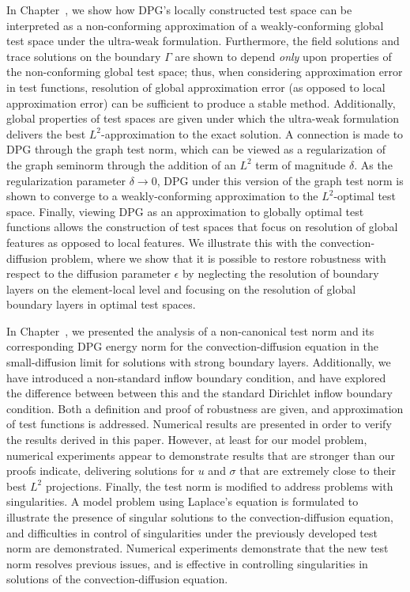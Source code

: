 In Chapter~, we show how DPG's locally constructed test space can be interpreted as a non-conforming approximation of a weakly-conforming global test space under the ultra-weak formulation.  Furthermore, the field solutions and trace solutions on the boundary $\Gamma$ are shown to depend \textit{only} upon properties of the non-conforming global test space; thus, when considering approximation error in test functions, resolution of global approximation error (as opposed to local approximation error) can be sufficient to produce a stable method.  Additionally, global properties of test spaces are given under which the ultra-weak formulation delivers the best $L^2$-approximation to the exact solution.  A connection is made to DPG through the graph test norm, which can be viewed as a regularization of the graph seminorm through the addition of an $L^2$ term of magnitude $\delta$. As the regularization parameter $\delta \rightarrow 0$, DPG under this version of the graph test norm is shown to converge to a weakly-conforming approximation to the $L^2$-optimal test space.  Finally, viewing DPG as an approximation to globally optimal test functions allows the construction of test spaces that focus on resolution of global features as opposed to local features.  We illustrate this with the convection-diffusion problem, where we show that it is possible to restore robustness with respect to the diffusion parameter $\epsilon$ by neglecting the resolution of boundary layers on the element-local level and focusing on the resolution of global boundary layers in optimal test spaces.  

In Chapter~, we presented the analysis of a non-canonical test norm and its corresponding DPG energy norm for the convection-diffusion equation in the small-diffusion limit for solutions with strong boundary layers. Additionally, we have introduced a non-standard inflow boundary condition, and have explored the difference between between this and the standard Dirichlet inflow boundary condition. Both a definition and proof of robustness are given, and approximation of test functions is addressed.  Numerical results are presented in order to verify the results derived in this paper. However, at least for our model problem, numerical experiments appear to demonstrate results that are stronger than our proofs indicate, delivering solutions for $u$ and $\sigma$ that are extremely close to their best $L^2$ projections.   Finally, the test norm is modified to address problems with singularities.  A model problem using Laplace's equation is formulated to illustrate the presence of singular solutions to the convection-diffusion equation, and difficulties in control of singularities under the previously developed test norm are demonstrated.  Numerical experiments demonstrate that the new test norm resolves previous issues, and is effective in controlling singularities in solutions of the convection-diffusion equation.  

